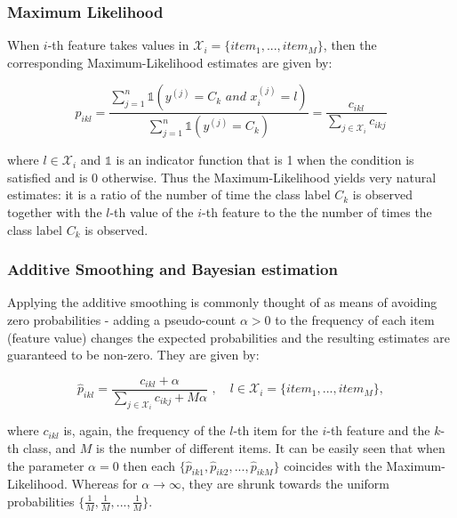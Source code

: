 \documentclass{article}\usepackage[]{graphicx}\usepackage[]{color}
\begin{document}
\subsubsection{Maximum Likelihood}

When $i$-th feature takes values in $\mathcal{X}_i = \{item_1,...,item_M\}$, then the corresponding Maximum-Likelihood estimates are given by:

$$\hat{p}_{ikl} = \frac{\sum_{j=1}^n \mathbb{1}(y^{(j)} = C_k \,\, and \,\, x_i^{(j)} = l)}{\sum_{j=1}^n \mathbb{1}(y^{(j)} = C_k)} = \frac{c_{ikl}}{\sum_{j\in \mathcal{X}_i} c_{ikj}}$$

where $l \in \mathcal{X}_i$ and $\mathbb{1}$ is an indicator function that is 1 when the condition is satisfied and is 0 otherwise. Thus the Maximum-Likelihood yields very natural estimates: it is a ratio of the number of time the class label $C_k$ is observed together with the $l$-th value of the $i$-th feature to the the number of times the class label $C_k$ is observed.

\subsubsection{Additive Smoothing and Bayesian estimation}

Applying the additive smoothing is commonly thought of as means of avoiding zero probabilities - adding a pseudo-count $\alpha > 0$ to the frequency of each item (feature value) changes the expected probabilities and the resulting estimates are guaranteed to be non-zero. They are given by:

$$\hat{p}_{ikl} = \frac{c_{ikl} + \alpha}{\sum_{j\in \mathcal{X}_i} c_{ikj} + M\alpha}\,\,, \,\,\,\,\,\, l \in \mathcal{X}_i = \{item_1,...,item_M\}, $$

where $c_{ikl}$ is, again, the frequency of the $l$-th item for the $i$-th feature and the $k$-th class, and $M$ is the number of different items. It can be easily seen that when the parameter $\alpha = 0$ then each $\{\hat{p}_{ik1}, \hat{p}_{ik2},  ... ,  \hat{p}_{ikM}\}$ coincides with the Maximum-Likelihood. Whereas for $\alpha \rightarrow \infty$, they are shrunk towards the uniform probabilities $\{ \frac{1}{M}, \frac{1}{M}, ... , \frac{1}{M} \}$.
\end{document}
